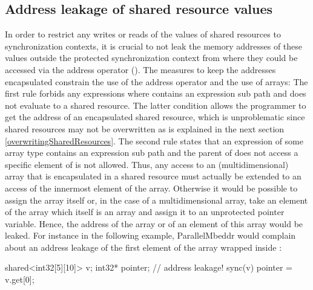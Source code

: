 \subsection{Address leakage of shared resource values}
In order to restrict any writes or reads of the values of shared resources to synchronization contexts, it is crucial to not leak the memory addresses of these values outside the protected synchronization context from where they could be accessed via the address operator (\CODE{\&}). The measures to keep the addresses encapsulated constrain the use of the address operator and the use of arrays: The first rule forbids any expressions  where  contains an expression sub path  and  does not evaluate to a shared resource. The latter condition allows the programmer to get the address of an encapsulated shared resource, which is unproblematic since shared resources may not be overwritten as is explained in the next section \ref{overwritingSharedResources}. The second rule states that an expression  of some array type contains an expression sub path  and the parent of  does not access a specific element of  is not allowed. Thus, any access to an (multidimensional) array that is encapsulated in a shared resource must actually be extended to an access of the innermost element of the array. Otherwise it would be possible to assign the array itself or, in the case of a multidimensional array, take an element of the array which itself is an array and assign it to an unprotected pointer variable. Hence, the address of the array or of an element of this array would be leaked. For instance in the following example, ParallelMbeddr would complain about an address leakage of the first element of the array wrapped inside :
\begin{ccode}
shared<int32[5][10]> v;
int32* pointer;
// address leakage!
sync(v) { pointer = v.get[0]; }
\end{ccode}

